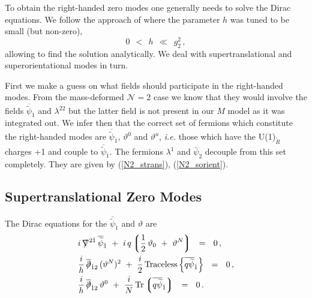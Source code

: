 \documentclass[12pt]{article}
\def\beq{\begin{equation}}
\def\eeq{\end{equation}}
\newcommand{\ntwo}{${\mathcal N}=2$ }
\newcommand{\p}{\partial}
\newcommand{\wt}{\widetilde}
\newcommand{\ov}{\overline}
\newcommand{\lgr}{\left\lgroup}
\newcommand{\rgr}{\right\rgroup}
\def\slashed#1{\setbox0=\hbox{$#1$}             %
   \dimen0=\wd0                                 %
   \setbox1=\hbox{/} \dimen1=\wd1               %
   \ifdim\dimen0>\dimen1                        %
      \rlap{\hbox to \dimen0{\hfil/\hfil}}      %
      #1                                        %
   \else                                        %
      \rlap{\hbox to \dimen1{\hfil$#1$\hfil}}   %
      /                                         %
   \fi}                                        %
\begin{document}
	To obtain the right-handed zero modes one generally needs to solve the Dirac equations.
	We follow the approach of \cite{GSYmmodel} where the parameter $ h $ was tuned to be  
	small (but non-zero),
\beq
\label{smallh}
	0 ~~<~~ h ~~\ll~~ g_2^2\,,
\eeq
	allowing to find the solution analytically.
	We deal with supertranslational and superorientational modes in turn.

	First we make a guess on what fields should participate in the right-handed modes. 
	From the mass-deformed \ntwo case \cite{BSYhet} we know that they would involve
	the fields $ \ov{\wt{\psi}}{}_{\dot 1} $ and $ \lambda^{22} $ but
	the latter field is not present in our $M$ model as it was integrated out.
	We infer then that the correct set of fermions which constitute the right-handed modes
	are $ \ov{\wt{\psi}}{}_{\dot 1} $, $ \vartheta^0 $ and $ \vartheta^a $, {\it i.e.}
	those which have the U(1)$_{\wt R}$ charges +1 and couple to $ \ov{\wt{\psi}}{}_{\dot 1} $.
	The fermions $ \lambda^{1} $ and $\bar{\psi}_{\dot{2}}$
        decouple from this set completely. They are given by (\ref{N2_strans}), (\ref{N2_sorient}).

\subsection{Supertranslational Zero Modes}

	The Dirac equations for the $ \ov{\wt \psi}{}_{\dot 1} $ and $ \vartheta $ are
\begin{align*}
%
&
	i\, \slashed{\nabla}^{2\dot{1}}\, \ov{\wt\psi}{}_{\dot 1}  
		~+~  i\, q \lgr \frac{1}{2}\, \vartheta_0  ~+~ \vartheta^N \rgr ~~=~~ 0\,, \\
%
&
	\frac{i}{h}\, \ov{\slashed{\p}}{}_{\dot{1}2}\, (\vartheta^N)^2
		~+~ \frac{i}{2}\, {\rm Traceless} \left\{ \ov{q \wt{\psi}}{}_{\dot 1} \right\} ~~=~~ 0\,, \\
%
&
	\frac{i}{h}\, \ov{\slashed{\p}}_{\dot{1}2}\, \vartheta^0 
		~+~ \frac{i}{N}\, {\rm Tr} \lgr \ov{q \wt{\psi}}{}_{\dot 1} \rgr ~~=~~ 0\,.
\end{align*}
\end{document}

